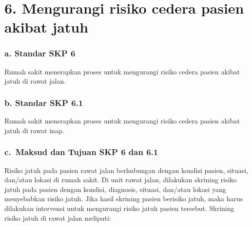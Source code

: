 \documentclass[
]{book}
\begin{document}
\hypertarget{mengurangi-risiko-cedera-pasien-akibat-jatuh}{%
\section*{6. Mengurangi risiko cedera pasien akibat jatuh}\label{mengurangi-risiko-cedera-pasien-akibat-jatuh}}

\hypertarget{a.-standar-skp-6}{%
\subsubsection*{a. Standar SKP 6}\label{a.-standar-skp-6}}

Rumah sakit menerapkan proses untuk mengurangi risiko cedera pasien akibat jatuh di rawat jalan.

\hypertarget{b.-standar-skp-6.1}{%
\subsubsection*{b. Standar SKP 6.1}\label{b.-standar-skp-6.1}}

Rumah sakit menerapkan proses untuk mengurangi risiko cedera pasien akibat jatuh di rawat inap.

\hypertarget{c.-maksud-dan-tujuan-skp-6-dan-6.1}{%
\subsubsection*{c.~Maksud dan Tujuan SKP 6 dan 6.1}\label{c.-maksud-dan-tujuan-skp-6-dan-6.1}}

Risiko jatuh pada pasien rawat jalan berhubungan dengan kondisi pasien, situasi, dan/atau lokasi di rumah sakit. Di unit rawat jalan, dilakukan skrining risiko jatuh pada pasien dengan kondisi, diagnosis, situasi, dan/atau lokasi yang menyebabkan risiko jatuh. Jika hasil skrining pasien berisiko jatuh, maka harus dilakukan intervensi untuk mengurangi risiko jatuh pasien tersebut. Skrining risiko jatuh di rawat jalan meliputi:
\end{document}

